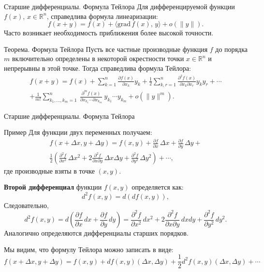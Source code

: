 \documentclass[8pt]{beamer}
\newcommand{\grad}{\mathrm{grad\,}}
\newcommand{\pp}[2]{\frac{\partial #1}{\partial #2}}
\begin{document}
\begin{frame}{Старшие дифференциалы. Формула Тейлора}
Для дифференцируемой функции $f(x)$, $x\in\mathbb{R}^n$, справедлива формула линеаризации:
$$f(x+y) = f(x) + \langle \grad f(x),\, y \rangle +o\left(\|y\|\right).$$
Часто возникает необходимость приближения более высокой точности. 
\begin{block}{Теорема. Формула Тейлора}
Пусть все частные производные функция $f$ до порядка $m$ включительно определены в некоторой окрестности точки $x\in\mathbb{R}^n$ и непрерывны в этой точке. Тогда справедлива формула Тейлора:
\begin{multline*}
f(x+y) = f(x) + \sum_{k=1}^n \pp{f(x)}{x_k}y_k + \frac{1}{2}\sum_{k,r=1}^n 
\frac{\partial^2f(x)}{\partial x_k\partial x_r}y_k y_r+
\cdots
\\+\frac{1}{m!}\sum_{k_1,\ldots,k_m = 1}^n \ \frac{\partial^m f(x)}{\partial x_{k_1}\cdots\partial x_{k_m}}\ y_{k_1}\cdots y_{k_m}+ o\left(\|y\|^{m}\right).
\end{multline*}
\end{block}
\end{frame}

\begin{frame}{Старшие дифференциалы. Формула Тейлора}
\begin{block}{Пример}
Для функции двух переменных получаем:
\begin{multline*}
f(x+\Delta x,y+\Delta y)  = f(x,y) + \pp{f}{x}\,\Delta x+\pp{f}{y}\,\Delta y+\\
\frac{1}{2}\left( \frac{\partial^2 f}{\partial x^2}\,\Delta x^2+2 \frac{\partial^2 f}{\partial x \partial y}\,\Delta x\Delta y+\frac{\partial^2 f}{\partial y^2}\,\Delta y^2\right)+\cdots,
\end{multline*}
где производные взяты в точке $(x,y)$.
\end{block}
{\bf Второй дифференциал} функции $f(x,y)$ определяется как:
$$d^2f(x,y) = d(df(x,y)),$$
Следовательно,
$$d^2f(x,y) = d\left(  \pp{f}{x}\,d x+\pp{f}{y}\,d y\right)  =  \frac{\partial^2 f}{\partial x^2}\,dx^2+2 \frac{\partial^2 f}{\partial x \partial y}\,dx dy+\frac{\partial^2 f}{\partial y^2}\,dy^2.$$
Аналогично определяются дифференциалы старших порядков.

Мы видим, что формулу Тейлора можно записать в виде:
$$f(x+\Delta x,y+\Delta y)  = f(x,y) +df(x,y)(\Delta x,\Delta y) +
\frac{1}{2}d^2f(x,y)(\Delta x,\Delta y)+\cdots
$$
\end{frame}
\end{document}
